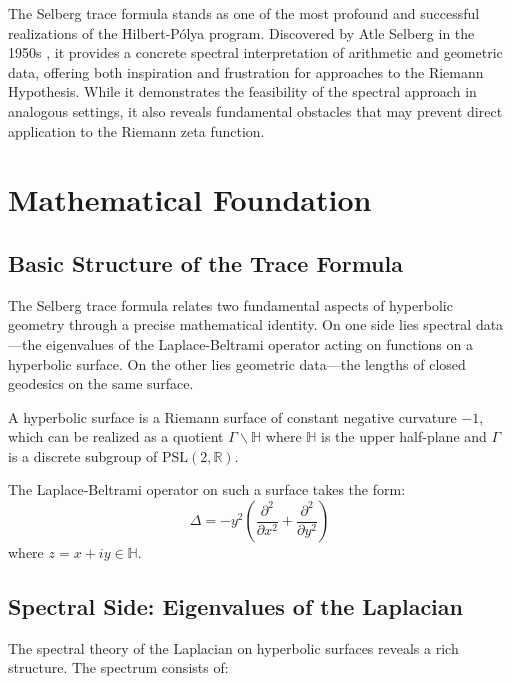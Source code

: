 \label{ch:selberg_trace}

The Selberg trace formula stands as one of the most profound and successful realizations of the Hilbert-Pólya program. Discovered by Atle Selberg in the 1950s \cite{marklof2007}, it provides a concrete spectral interpretation of arithmetic and geometric data, offering both inspiration and frustration for approaches to the Riemann Hypothesis. While it demonstrates the feasibility of the spectral approach in analogous settings, it also reveals fundamental obstacles that may prevent direct application to the Riemann zeta function.

\section{Mathematical Foundation}
\label{sec:mathematical_foundation}

\subsection{Basic Structure of the Trace Formula}

The Selberg trace formula relates two fundamental aspects of hyperbolic geometry through a precise mathematical identity. On one side lies spectral data—the eigenvalues of the Laplace-Beltrami operator acting on functions on a hyperbolic surface. On the other lies geometric data—the lengths of closed geodesics on the same surface.

\begin{definition}
\label{def:hyperbolic_surface}
A hyperbolic surface is a Riemann surface of constant negative curvature $-1$, which can be realized as a quotient $\Gamma \backslash \mathbb{H}$ where $\mathbb{H}$ is the upper half-plane and $\Gamma$ is a discrete subgroup of $\mathrm{PSL}(2,\mathbb{R})$.
\end{definition}

The Laplace-Beltrami operator on such a surface takes the form:
$$\Delta = -y^2 \left( \frac{\partial^2}{\partial x^2} + \frac{\partial^2}{\partial y^2} \right)$$
where $z = x + iy \in \mathbb{H}$.

\subsection{Spectral Side: Eigenvalues of the Laplacian}

The spectral theory of the Laplacian on hyperbolic surfaces reveals a rich structure. The spectrum consists of:

